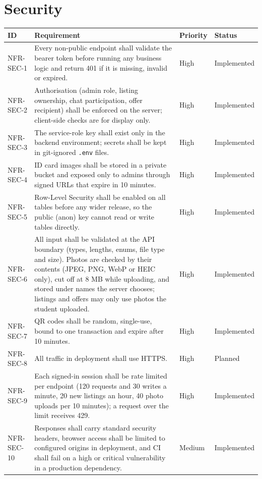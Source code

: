 \documentclass[11pt,a4paper]{scrreprt}
\newenvironment{reqtable}{%
  \small
  \begin{longtable}{>{\raggedright\arraybackslash\ttfamily\footnotesize}p{2.05cm} L{8.85cm} L{1.45cm} L{2.05cm}}
  \toprule
  \normalfont\normalsize\textbf{ID} & \textbf{Requirement} & \textbf{Priority} & \textbf{Status}\\
  \midrule\endhead
  \bottomrule\endfoot
}{\end{longtable}}
\newcommand{\impl}{Implemented}
\newcommand{\planned}{Planned}
\begin{document}
\section{Security}
\begin{reqtable}
NFR-SEC-1 & Every non-public endpoint shall validate the bearer token before running any business logic and return 401 if it is missing, invalid or expired. & High & \impl\\
NFR-SEC-2 & Authorisation (admin role, listing ownership, chat participation, offer recipient) shall be enforced on the server; client-side checks are for display only. & High & \impl\\
NFR-SEC-3 & The service-role key shall exist only in the backend environment; secrets shall be kept in git-ignored \texttt{.env} files. & High & \impl\\
NFR-SEC-4 & ID card images shall be stored in a private bucket and exposed only to admins through signed URLs that expire in 10 minutes. & High & \impl\\
NFR-SEC-5 & Row-Level Security shall be enabled on all tables before any wider release, so the public (anon) key cannot read or write tables directly. & High & \impl\\
NFR-SEC-6 & All input shall be validated at the API boundary (types, lengths, enums, file type and size). Photos are checked by their contents (JPEG, PNG, WebP or HEIC only), cut off at 8 MB while uploading, and stored under names the server chooses; listings and offers may only use photos the student uploaded. & High & \impl\\
NFR-SEC-7 & QR codes shall be random, single-use, bound to one transaction and expire after 10 minutes. & High & \impl\\
NFR-SEC-8 & All traffic in deployment shall use HTTPS. & High & \planned\\
NFR-SEC-9 & Each signed-in session shall be rate limited per endpoint (120 requests and 30 writes a minute, 20 new listings an hour, 40 photo uploads per 10 minutes); a request over the limit receives 429. & High & \impl\\
NFR-SEC-10 & Responses shall carry standard security headers, browser access shall be limited to configured origins in deployment, and CI shall fail on a high or critical vulnerability in a production dependency. & Medium & \impl\\
\end{reqtable}
\end{document}
